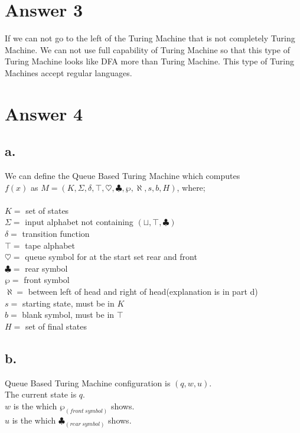 \documentclass[12pt]{article}
\begin{document}
\section*{Answer 3}

If we can not go to the left of the Turing Machine that is not completely Turing Machine. We can not use full capability of Turing Machine so that this type of Turing Machine looks like DFA more than Turing Machine. This type of Turing Machines accept regular languages.


\section*{Answer 4}





\subsection*{a.}

We can define the Queue Based Turing Machine which computes\\
 $f(x)$ as $M = (K,\Sigma,\delta, \top, \heartsuit, \clubsuit,\wp,\aleph, s,b, H)$, where;\\
\\
$K=$ set of states\\
$\Sigma=$ input alphabet not containing $(\sqcup, \top,\clubsuit)$\\
$\delta=$ transition function\\
$\top=$ tape alphabet\\
$\heartsuit=$ queue symbol for at the start set rear and front \\
$\clubsuit=$ rear symbol\\
$\wp=$ front symbol\\
$\aleph=$ between left of head and right of head(explanation is in part d)\\
$s=$ starting state, must be in $K$\\
$b=$ blank symbol, must be in $\top$\\
$H=$ set of final states 

\subsection*{b.}

Queue Based Turing Machine configuration is $(q, w, u)$. \\
The current state is $q$.\\
$w$ is the which $\wp_{(front~symbol)}$ shows.\\
$u$ is the which $\clubsuit_{(rear~symbol)}$ shows.\\
\end{document}
